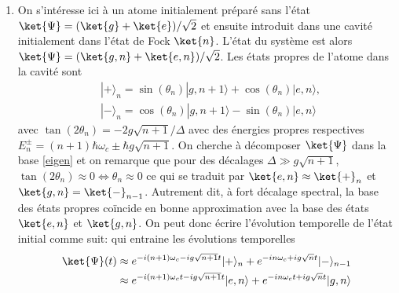 {\begin{enumerate}
    Pour faire correspondre \eqref{E2} au cas semi-classique, on prend $\hat{\varepsilon} = (i\hat{\varepsilon}_z + \hat{\varepsilon}_x)$ et $\mathbf{d}$ orthogonale à $x$ de sorte que 
    \begin{align}
        \Omega_n = -2 \sqrt{\frac{\omega_c}{2 \varepsilon_0 L^3\hbar }} \bra{g} \hat{\varepsilon}_z \cdot \mathbf{d} \ket{e} \sqrt{n+1} \label{E3}.
    \end{align}
    Avec le résultat \eqref{E3}, on remarque que la fréquence de Rabi pour le modèle quantique obtenue en 5. est retrouvée si on fait l'identification $g =-2 \sqrt{\frac{\omega_c}{2 \varepsilon_0 L^3\hbar }} \bra{g} \hat{\varepsilon}_z \cdot \mathbf{d} \ket{e}$. On peut également faire l'identification $E_0 = \sqrt{\frac{\omega_c}{2 \varepsilon_0 L^3\hbar }} \sqrt{n+1}$ qui indique que la dépendance en $n$ de la fréquence de Rabi quantique est une conséquence de la quantification du champ électromagnétique. Plus $n$ est grand, plus l'intensité du champ électrique est grande et classiquement cela se traduit par un grand $E_0$ effectif dans le terme forçant.
    \newpage 
    \item On s'intéresse ici à un atome initialement préparé sans l'état $\ket{\Psi} = (\ket{g} + \ket{e})/\sqrt{2}$ et ensuite introduit dans une cavité initialement dans l'état de Fock $\ket{n}$. L'état du système est alors $\ket{\Psi} = (\ket{g, n} + \ket{e, n})/\sqrt{2}$. Les états propres de l'atome dans la cavité sont 
    \begin{align}
            &|+\rangle_n=\sin (\theta_n)|g, n+1\rangle+\cos(\theta_n)|e, n\rangle, \nonumber \\
            &|-\rangle_n=\cos (\theta_n)|g, n+1\rangle-\sin(\theta_n)|e, n\rangle \label{eigen}
    \end{align}
    avec $\tan(2 \theta_n) = -2 g \sqrt{n+1}/\Delta$ avec des énergies propres respectives $E_n^{\pm}=(n+1) \hbar \omega_c \pm \hbar g \sqrt{n+1}$. On cherche à décomposer $\ket{\Psi}$ dans la base \eqref{eigen} et on remarque que pour des décalages $\Delta \gg g \sqrt{n+1}$, $\tan(2 \theta_n)\approx 0 \iff \theta_n \approx 0$ ce qui se traduit par $\ket{e, n}\approx \ket{+}_n$ et $\ket{g, n} = \ket{-}_{n-1}$. Autrement dit, à fort décalage spectral, la base des états propres coïncide en bonne approximation avec la base des états $\ket{e, n}$ et $\ket{g, n}$. On peut donc écrire l'évolution temporelle de l'état initial comme suit:
    qui entraine les évolutions temporelles
    \begin{align}
        \ket{\Psi}(t) &\approx e^{-i(n+1)\omega_c-i g \sqrt{n+1} t} |+\rangle_n + e^{-in\omega_c+i g \sqrt{n} t}|-\rangle_{n-1}\nonumber \\ &\approx e^{-i(n+1)\omega_c t-i g \sqrt{n+1} t} |e, n\rangle + e^{-in\omega_c t+i g \sqrt{n} t}|g, n\rangle \nonumber\\ 

\end{align}
\end{enumerate}}
